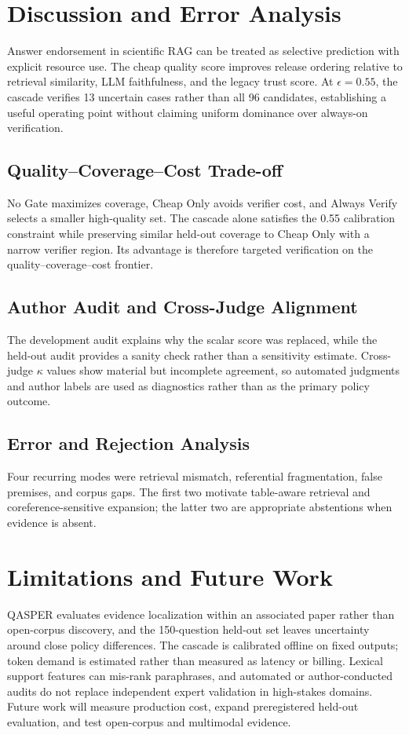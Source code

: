\documentclass[smallextended]{svjour3}
\begin{document}
\section{Discussion and Error Analysis}
\label{sec:discussion}

Answer endorsement in scientific RAG can be treated as selective prediction with explicit resource use. The cheap quality score improves release ordering relative to retrieval similarity, LLM faithfulness, and the legacy trust score. At $\epsilon=0.55$, the cascade verifies 13 uncertain cases rather than all 96 candidates, establishing a useful operating point without claiming uniform dominance over always-on verification.

\subsection{Quality--Coverage--Cost Trade-off}
\label{subsec:tradeoff}
No Gate maximizes coverage, Cheap Only avoids verifier cost, and Always Verify selects a smaller high-quality set. The cascade alone satisfies the 0.55 calibration constraint while preserving similar held-out coverage to Cheap Only with a narrow verifier region. Its advantage is therefore targeted verification on the quality--coverage--cost frontier.

\subsection{Author Audit and Cross-Judge Alignment}
\label{subsec:human_alignment}
The development audit explains why the scalar score was replaced, while the held-out audit provides a sanity check rather than a sensitivity estimate. Cross-judge $\kappa$ values show material but incomplete agreement, so automated judgments and author labels are used as diagnostics rather than as the primary policy outcome.

\subsection{Error and Rejection Analysis}
\label{subsec:error_analysis}
Four recurring modes were retrieval mismatch, referential fragmentation, false premises, and corpus gaps. The first two motivate table-aware retrieval and coreference-sensitive expansion; the latter two are appropriate abstentions when evidence is absent.

\section{Limitations and Future Work}
\label{subsec:limitations}
QASPER evaluates evidence localization within an associated paper rather than open-corpus discovery, and the 150-question held-out set leaves uncertainty around close policy differences. The cascade is calibrated offline on fixed outputs; token demand is estimated rather than measured as latency or billing. Lexical support features can mis-rank paraphrases, and automated or author-conducted audits do not replace independent expert validation in high-stakes domains. Future work will measure production cost, expand preregistered held-out evaluation, and test open-corpus and multimodal evidence.
\end{document}

